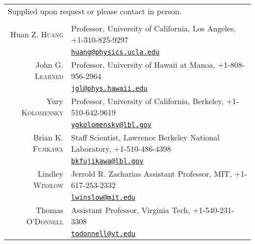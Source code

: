 \documentclass[10pt]{article} %
\begin{document}
\noindent\begin{tabular}{rp{12cm}}
\multicolumn{2}{l}{\footnotesize{Supplied upon request or please contact in
	person.}}\\
\multicolumn{2}{c}{}\\
Huan Z. \textsc{Huang} & Professor, University of California, Los Angeles, +1-310-825-9297\\
& \href{mailto:huang@physics.ucla.edu}{\nolinkurl{huang@physics.ucla.edu}}\\
John G. \textsc{Learned} & Professor, University of Hawaii at Manoa, +1-808-956-2964\\
& \href{mailto:jgl@phys.hawaii.edu}{\nolinkurl{jgl@phys.hawaii.edu}}\\
Yury \textsc{Kolomensky} & Professor, University of California, Berkeley, +1-510-642-9619\\
& \href{mailto:ygkolomensky@lbl.gov}{\nolinkurl{ygkolomensky@lbl.gov}}\\
Brian K. \textsc{Fujikawa} & Staff Scientist, Lawrence Berkeley National Laboratory, +1-510-486-4398\\
& \href{mailto:bkfujikawa@lbl.gov}{\nolinkurl{bkfujikawa@lbl.gov}}\\
Lindley \textsc{Winslow} & Jerrold R. Zacharias Assistant Professor, MIT, +1-617-253-2332\\
& \href{mailto:lwinslow@mit.edu}{\nolinkurl{lwinslow@mit.edu}}\\ 
Thomas \textsc{O'Donnell} & Assistant Professor, Virginia Tech, +1-540-231-3308\\
& \href{mailto:todonnell@vt.edu}{\nolinkurl{todonnell@vt.edu}}\\

%
%

\end{tabular}

\end{document}
